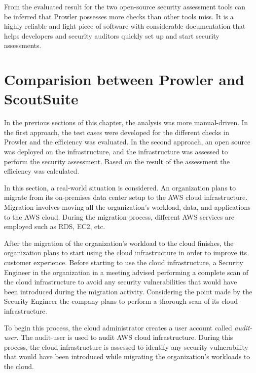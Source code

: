 \par From the evaluated result for the two open-source security assessment tools can be inferred that Prowler possesses more checks than other tools miss.
It is a highly reliable and light piece of software with considerable documentation that helps developers and security auditors quickly set up and start security assessments.

\section{Comparision between Prowler and ScoutSuite}

\par In the previous sections of this chapter, the analysis was more manual-driven.
In the first approach, the test cases were developed for the different checks in Prowler and the efficiency was evaluated.
In the second approach, an open source was deployed on the infrastructure, and the infrastructure was assessed to perform the security assessment.
Based on the result of the assessment the efficiency was calculated.
\\
\par In this section, a real-world situation is considered.
An organization plans to migrate from its on-premises data center setup to the AWS cloud infrastructure.
Migration involves moving all the organization’s workload, data, and applications to the AWS cloud.
During the migration process, different AWS services are employed such as RDS, EC2, etc.
\\
\par After the migration of the organization's workload
to the cloud finishes, the organization plans to start using the cloud infrastructure in order to improve its customer experience.
Before starting to use the cloud infrastructure, a Security Engineer in the organization in a meeting advised performing a complete scan of the cloud infrastructure to avoid any security vulnerabilities that would have been introduced during the migration activity.
Considering the point made by the Security Engineer the company plans to perform a thorough scan of its cloud infrastructure.
\\
\par To begin this process, the cloud administrator creates a user account called \textit{audit-user}.
The audit-user is used to audit AWS cloud infrastructure.
During this process, the cloud infrastructure is assessed to identify any security vulnerability that would have been introduced while migrating the organization’s workloads to the cloud.
